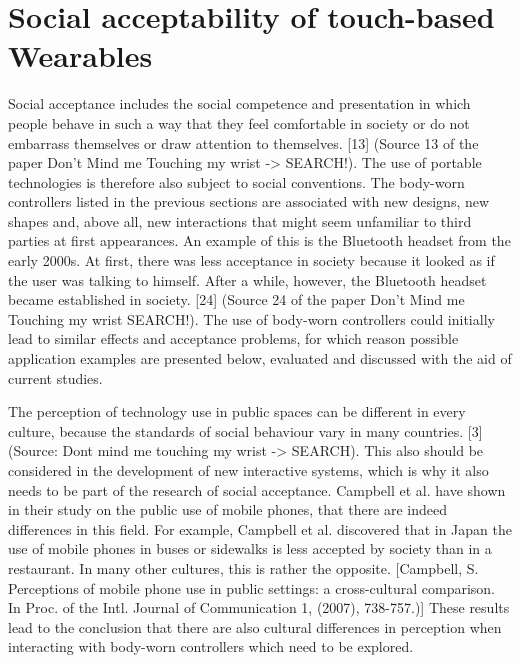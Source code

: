 \documentclass{sigchi}
\begin{document}

\section{Social acceptability of touch-based Wearables}

Social acceptance includes the social competence and presentation in which people behave in such a way that they feel comfortable in society or do not embarrass themselves or draw attention to themselves. [13] (Source 13 of the paper Don't Mind me Touching my wrist -> SEARCH!). The use of portable technologies is therefore also subject to social conventions. The body-worn controllers listed in the previous sections are associated with new designs, new shapes and, above all, new interactions that might seem unfamiliar to third parties at first appearances.
An example of this is the Bluetooth headset from the early 2000s. At first, there was less acceptance in society because it looked as if the user was talking to himself. After a while, however, the Bluetooth headset became established in society. [24] (Source 24 of the paper Don't Mind me Touching my wrist SEARCH!). The use of body-worn controllers could initially lead to similar effects and acceptance problems, for which reason possible application examples are presented below, evaluated and discussed with the aid of current studies.

The perception of technology use in public spaces can be different in every culture, because the standards of social behaviour vary in many countries. [3] (Source: Dont mind me touching my wrist -> SEARCH). This also should be considered in the development of new interactive systems, which is why it also needs to be part of the research of social acceptance.  Campbell et al. have shown in their study on the public use of mobile phones, that there are indeed differences in this field. For example, Campbell et al. discovered that in Japan the use of mobile phones in buses or sidewalks is less accepted by society than in a restaurant. In many other cultures, this is rather the opposite. [Campbell, S. Perceptions of mobile phone use in public settings: a cross-cultural comparison. In Proc. of the Intl. Journal of Communication 1, (2007), 738-757.)]
These results lead to the conclusion that there are also cultural differences in perception when interacting with body-worn controllers which need to be explored.
\end{document}
